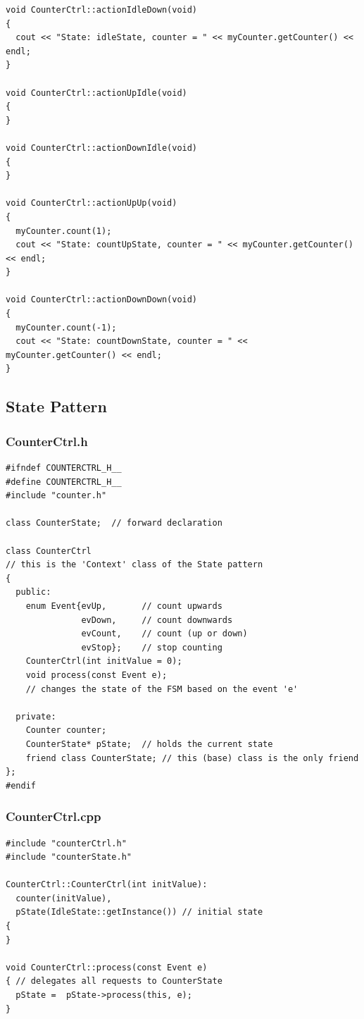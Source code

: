 \begin{lstlisting}[style=Csharp]
void CounterCtrl::actionIdleDown(void)
{
  cout << "State: idleState, counter = " << myCounter.getCounter() << endl;
}

void CounterCtrl::actionUpIdle(void)
{
}

void CounterCtrl::actionDownIdle(void)
{
}

void CounterCtrl::actionUpUp(void)
{
  myCounter.count(1);
  cout << "State: countUpState, counter = " << myCounter.getCounter() << endl;
}

void CounterCtrl::actionDownDown(void)
{
  myCounter.count(-1);
  cout << "State: countDownState, counter = " << myCounter.getCounter() << endl;
}
\end{lstlisting}

\subsection{State Pattern}
\subsubsection{CounterCtrl.h}
\begin{lstlisting}[style=Csharp]
#ifndef COUNTERCTRL_H__
#define COUNTERCTRL_H__
#include "counter.h"

class CounterState;  // forward declaration

class CounterCtrl
// this is the 'Context' class of the State pattern
{
  public:
    enum Event{evUp,       // count upwards
               evDown,     // count downwards
               evCount,    // count (up or down)
               evStop};    // stop counting
    CounterCtrl(int initValue = 0);
    void process(const Event e);  
    // changes the state of the FSM based on the event 'e'
    
  private:
    Counter counter;
    CounterState* pState;  // holds the current state
    friend class CounterState; // this (base) class is the only friend
};
#endif
\end{lstlisting}

\subsubsection{CounterCtrl.cpp}
\begin{lstlisting}[style=Csharp]
#include "counterCtrl.h"
#include "counterState.h"

CounterCtrl::CounterCtrl(int initValue): 
  counter(initValue), 
  pState(IdleState::getInstance()) // initial state
{
}

void CounterCtrl::process(const Event e)
{ // delegates all requests to CounterState
  pState =  pState->process(this, e);
}
\end{lstlisting}

